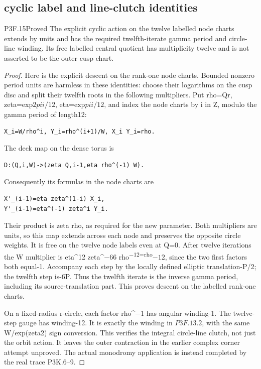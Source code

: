 \subsection{cyclic label and line-clutch identities}
\begin{statement}{P3F.15}{Proved}
The explicit cyclic action on the twelve labelled node charts extends by units and has the required twelfth-iterate gamma period and circle-line winding. Its free labelled central quotient has multiplicity twelve and is not asserted to be the outer cusp chart.
\end{statement}
\begin{proof}
Here is the explicit descent on the rank-one node charts. Bounded nonzero period units are harmless in these identities: choose their logarithms on the cusp disc and split their twelfth roots in the following multipliers. Put rho=Qr, zeta=exp\(2pi i/12\), eta=exp\(pi i/12\), and index the node charts by i in Z, modulo the gamma period of length12:

\begin{lstlisting}
X_i=W/rho^i, Y_i=rho^(i+1)/W, X_i Y_i=rho.
\end{lstlisting}

The deck map on the dense torus is

\begin{lstlisting}
D:(Q,i,W)->(zeta Q,i-1,eta rho^(-1) W).
\end{lstlisting}

Consequently its formulas in the node charts are

\begin{lstlisting}
X'_(i-1)=eta zeta^(1-i) X_i,
Y'_(i-1)=eta^(-1) zeta^i Y_i.
\end{lstlisting}

Their product is zeta rho, as required for the new parameter. Both multipliers are units, so this map extends across each node and preserves the opposite circle weights. It is free on the twelve node labels even at Q=0. After twelve iterations the W multiplier is eta\^{}12 zeta\^{}\(-66\) rho\textsuperscript{\(-12\)=rho}\(-12\), since the two first factors both equal-1. Accompany each step by the locally defined elliptic translation-P/2; the twelfth step is-6P. Thus the twelfth iterate is the inverse gamma period, including its source-translation part. This proves descent on the labelled rank-one charts.

On a fixed-radius r-circle, each factor rho\^{}\(-1\) has angular winding-1. The twelve-step gauge has winding-12. It is exactly the winding in \(P3F.13.2\), with the same W/exp(zeta2) sign conversion. This verifies the integral circle-line clutch, not just the orbit action. It leaves the outer contraction in the earlier complex corner attempt unproved. The actual monodromy application is instead completed by the real trace P3K.6--9.


\end{proof}
